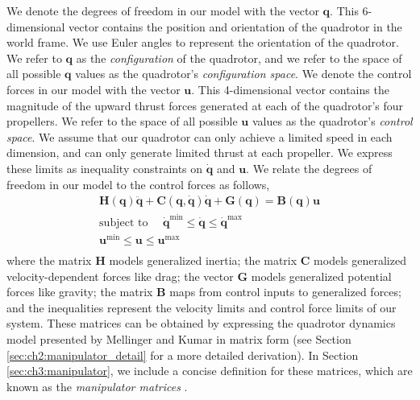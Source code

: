 We denote the degrees of freedom in our model with the vector $\mathbf{q}$.
This 6-dimensional vector contains the position and orientation of the quadrotor in the world frame.
We use Euler angles to represent the orientation of the quadrotor.
We refer to $\mathbf{q}$ as the \emph{configuration} of the quadrotor, and we refer to the space of all possible $\mathbf{q}$ values as the quadrotor's \emph{configuration space}. We denote the control forces in our model with the vector $\mathbf{u}$.
This 4-dimensional vector contains the magnitude of the upward thrust forces generated at each of the quadrotor's four propellers.
We refer to the space of all possible $\mathbf{u}$ values as the quadrotor's \emph{control space}.
We assume that our quadrotor can only achieve a limited speed in each dimension, and can only generate limited thrust at each propeller.
We express these limits as inequality constraints on $\dot{\mathbf{q}}$ and $\mathbf{u}$.
We relate the degrees of freedom in our  model to the control forces as follows,
%
\begin{equation}
\begin{aligned}
\mathbf{H}(\mathbf{q}) \ddot{\mathbf{q}} + \mathbf{C}(\mathbf{q},\dot{\mathbf{q}}) \dot{\mathbf{q}} + \mathbf{G}(\mathbf{q}) = \mathbf{B}(\mathbf{q}) \mathbf{u}\\
\text{subject to~~~~} \dot{\mathbf{q}}^{\text{min}} \leq \dot{\mathbf{q}} \leq \dot{\mathbf{q}}^{\text{max}}~~~~~~~~~\\
                      \mathbf{u}^{\text{min}}       \leq \mathbf{u}       \leq \mathbf{u}^{\text{max}}~~~~~~~~~\\
\end{aligned}
\label{eqn:ch3:manipulator}
\end{equation}
%
where
the matrix $\mathbf{H}$ models generalized inertia;
the matrix $\mathbf{C}$ models generalized velocity-dependent forces like drag;
the vector $\mathbf{G}$ models generalized potential forces like gravity;
the matrix $\mathbf{B}$ maps from control inputs to generalized forces;
and the inequalities represent the velocity limits and control force limits of our system.
These matrices can be obtained by expressing the quadrotor dynamics model presented by Mellinger and Kumar  in matrix form (see Section \ref{sec:ch2:manipulator_detail} for a more detailed derivation).
In Section \ref{sec:ch3:manipulator}, we include a concise definition for these matrices, which are known as the \emph{manipulator matrices} \cite{tedrake:2016}.

